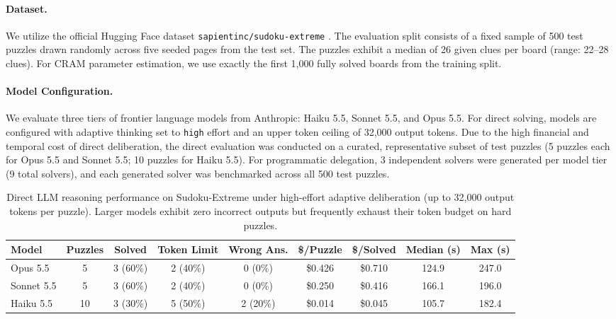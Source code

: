 \documentclass{article} %
\begin{document}
\paragraph{Dataset.} We utilize the official Hugging Face dataset \texttt{sapientinc/sudoku-extreme} \citep{sapientinc_sudoku_extreme}. The evaluation split consists of a fixed sample of 500 test puzzles drawn randomly across five seeded pages from the test set. The puzzles exhibit a median of 26 given clues per board (range: 22--28 clues). For CRAM parameter estimation, we use exactly the first 1,000 fully solved boards from the training split.

\paragraph{Model Configuration.} We evaluate three tiers of frontier language models from Anthropic: Haiku 5.5, Sonnet 5.5, and Opus 5.5. For direct solving, models are configured with adaptive thinking set to \texttt{high} effort and an upper token ceiling of 32,000 output tokens. Due to the high financial and temporal cost of direct deliberation, the direct evaluation was conducted on a curated, representative subset of test puzzles (5 puzzles each for Opus 5.5 and Sonnet 5.5; 10 puzzles for Haiku 5.5). For programmatic delegation, 3 independent solvers were generated per model tier (9 total solvers), and each generated solver was benchmarked across all 500 test puzzles.

\begin{table}[t]
\centering
\small
\caption{Direct LLM reasoning performance on Sudoku-Extreme under high-effort adaptive deliberation (up to 32,000 output tokens per puzzle). Larger models exhibit zero incorrect outputs but frequently exhaust their token budget on hard puzzles.}
\label{tab:llm_direct}
\begin{tabular}{lcccccccc}
\toprule
\textbf{Model} & \textbf{Puzzles} & \textbf{Solved} & \textbf{Token Limit} & \textbf{Wrong Ans.} & \textbf{\$/Puzzle} & \textbf{\$/Solved} & \textbf{Median (s)} & \textbf{Max (s)} \\
\midrule
Opus 5.5   & 5  & 3 (60\%) & 2 (40\%) & 0 (0\%)  & \$0.426 & \$0.710 & 124.9 & 247.0 \\
Sonnet 5.5 & 5  & 3 (60\%) & 2 (40\%) & 0 (0\%)  & \$0.250 & \$0.416 & 166.1 & 196.0 \\
Haiku 5.5  & 10 & 3 (30\%) & 5 (50\%) & 2 (20\%) & \$0.014 & \$0.045 & 105.7 & 182.4 \\
\bottomrule
\end{tabular}
\end{table}
\end{document}
